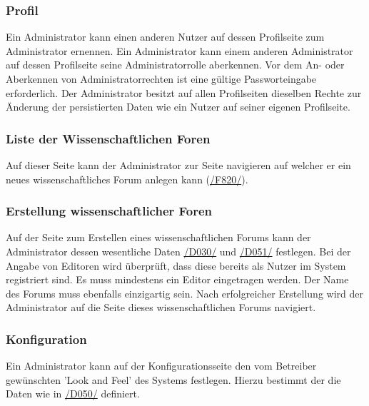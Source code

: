 \subsubsection{Profil}
\begin{description}
     Ein Administrator kann einen anderen Nutzer auf dessen Profilseite zum Administrator ernennen.
     Ein Administrator kann einem anderen Administrator auf dessen Profilseite seine
    Administratorrolle aberkennen.
     Vor dem An- oder Aberkennen von Administratorrechten ist eine gültige
    Passworteingabe erforderlich.
     Der Administrator besitzt auf allen Profilseiten dieselben Rechte zur Änderung
    der persistierten Daten wie ein Nutzer auf seiner eigenen Profilseite. %
\end{description}

\subsubsection{Liste der Wissenschaftlichen Foren}
\begin{description}
     Auf dieser Seite kann der Administrator zur Seite navigieren auf welcher er ein neues
    wissenschaftliches Forum anlegen kann (\hyperref[funkt:820]{/F820/}).
\end{description}

\subsubsection{Erstellung wissenschaftlicher Foren}
\begin{description}
     Auf der Seite zum Erstellen eines wissenschaftlichen Forums kann der Administrator dessen
    wesentliche Daten \hyperref[d030]{/D030/} und \hyperref[d051]{/D051/}
    festlegen. Bei der Angabe von Editoren wird überprüft, dass diese bereits als Nutzer im System registriert sind.
    Es muss mindestens ein Editor eingetragen werden.
    Der Name des Forums muss ebenfalls einzigartig sein.
    Nach erfolgreicher Erstellung wird der Administrator auf die Seite dieses wissenschaftlichen Forums
    navigiert.
\end{description}

\subsubsection{Konfiguration}
\begin{description}
     Ein Administrator kann auf der Konfigurationsseite den vom Betreiber gewünschten
    'Look and Feel' des Systems festlegen. Hierzu bestimmt der die Daten wie in \hyperref[d050/]{/D050/} definiert.
\end{description}